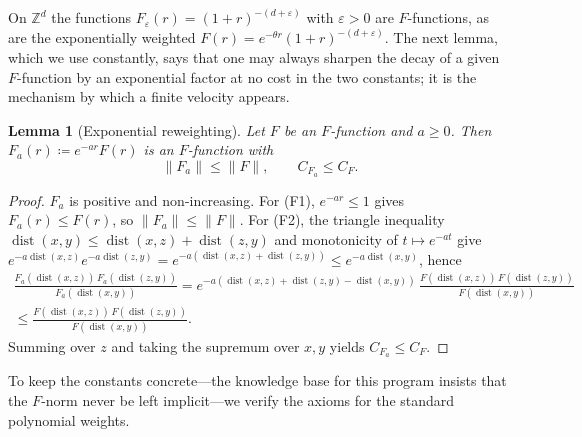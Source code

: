 \documentclass[12pt]{article}
\newcommand{\Ffun}{F}                          %
\newcommand{\norm}[1]{\lVert #1\rVert}
\newcommand{\dist}{\operatorname{dist}}
\newcommand{\Z}{\mathbb{Z}}
\newcommand{\eqdef}{\coloneqq}
\newtheorem{lemma}[theorem]{Lemma}
\theoremstyle{definition}
\theoremstyle{remark}
\begin{document}
On $\Z^d$ the functions $\Ffun_\varepsilon(r)=(1+r)^{-(d+\varepsilon)}$ with $\varepsilon>0$
are $\Ffun$-functions, as are the exponentially weighted $\Ffun(r)=e^{-\theta r}
(1+r)^{-(d+\varepsilon)}$. The next lemma, which we use constantly, says that one may always
sharpen the decay of a given $\Ffun$-function by an exponential factor at no cost in the two
constants; it is the mechanism by which a finite velocity appears.

\begin{lemma}[Exponential reweighting]
\label{lem:reweight}
Let $\Ffun$ be an $\Ffun$-function and $a\ge 0$. Then $\Ffun_a(r)\eqdef e^{-ar}\Ffun(r)$ is
an $\Ffun$-function with
\[
  \norm{\Ffun_a}\le\norm{\Ffun}, \qquad C_{\Ffun_a}\le C_\Ffun .
\]
\end{lemma}
\begin{proof}
$\Ffun_a$ is positive and non-increasing. For (F1), $e^{-ar}\le 1$ gives
$\Ffun_a(r)\le\Ffun(r)$, so $\norm{\Ffun_a}\le\norm{\Ffun}$. For (F2), the triangle
inequality $\dist(x,y)\le\dist(x,z)+\dist(z,y)$ and monotonicity of $t\mapsto e^{-at}$ give
$e^{-a\dist(x,z)}e^{-a\dist(z,y)}=e^{-a(\dist(x,z)+\dist(z,y))}\le e^{-a\dist(x,y)}$, hence
\begin{multline*}
  \frac{\Ffun_a(\dist(x,z))\,\Ffun_a(\dist(z,y))}{\Ffun_a(\dist(x,y))}
  =e^{-a(\dist(x,z)+\dist(z,y)-\dist(x,y))}\,
   \frac{\Ffun(\dist(x,z))\,\Ffun(\dist(z,y))}{\Ffun(\dist(x,y))}\\
  \le \frac{\Ffun(\dist(x,z))\,\Ffun(\dist(z,y))}{\Ffun(\dist(x,y))}.
\end{multline*}
Summing over $z$ and taking the supremum over $x,y$ yields $C_{\Ffun_a}\le C_\Ffun$.
\end{proof}

To keep the constants concrete---the knowledge base for this program insists that the
$\Ffun$-norm never be left implicit---we verify the axioms for the standard polynomial weights.
\end{document}
